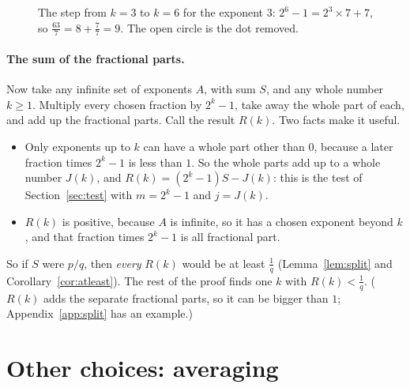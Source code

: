 \documentclass[10pt]{article}
\theoremstyle{plain}
\theoremstyle{definition}
\theoremstyle{remark}
\begin{document}
\begin{figure}[htb]
\centering
{}
\caption{The step from $k=3$ to $k=6$ for the exponent $3$: $2^6-1=2^3\times7+7$,
so $\tfrac{63}7=8+\tfrac77=9$. The open circle is the dot removed.}
\label{fig:dots}
\end{figure}

\paragraph{The sum of the fractional parts.} Now take any infinite set of exponents $A$,
with sum $S$, and any whole number $k\ge1$. Multiply every chosen fraction by
$2^k-1$, take away the whole part of each, and add up the fractional parts. Call the
result $R(k)$. Two facts make it useful.
\begin{itemize}
\item Only exponents up to $k$ can have a whole part other than $0$, because
 a later fraction times $2^k-1$ is less than $1$. So the whole parts add up to a whole
 number $J(k)$, and $R(k)=(2^k-1)S-J(k)$: this is the test of
 Section~\ref{sec:test} with $m=2^k-1$ and $j=J(k)$.
\item $R(k)$ is positive, because $A$ is infinite, so it has a chosen exponent
 beyond $k$, and that fraction times $2^k-1$ is all fractional part.
\end{itemize}
So if $S$ were $p/q$, then \emph{every} $R(k)$ would be at least $\tfrac1q$
(Lemma~\ref{lem:split} and Corollary~\ref{cor:atleast}). The rest of the proof
finds one $k$ with $R(k)<\tfrac1q$. ($R(k)$ adds the separate fractional
parts, so it can be bigger than $1$; Appendix~\ref{app:split} has an
example.)

\section{Other choices: averaging}\label{sec:general}
\end{document}
